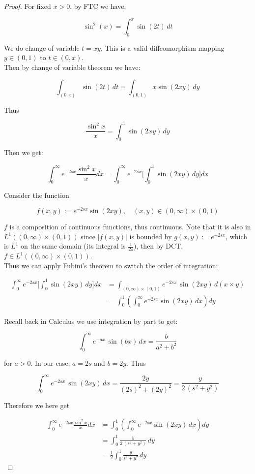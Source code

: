 \documentclass{qlnotes-export}
\begin{document}
\begin{proof}

For fixed \(x > 0\), by FTC we have:

\[\sin^{2}(x) = \int_{0}^{x}\sin(2t)\, dt\]

We do change of variable \(t = xy\). This is a valid diffeomorphism mapping \(y \in (0,1)\) to \(t \in (0,x)\).\\
Then by change of variable theorem we have:

\[\int_{(0,x)}\sin(2t)\, dt = \int_{(0,1)}x\sin(2xy)\, dy\]

Thus

\[\frac{\sin^{2}x}{x} = \int_{0}^{1}\sin(2xy)\, dy\]

Then we get:

\[\int_{0}^{\infty}e^{- 2sx}\frac{\sin^{2}x}{x} dx = \int_{0}^{\infty}e^{- 2sx}\lbrack\int_{0}^{1}\sin(2xy)\, dy\rbrack dx\]

Consider the function

\[f(x,y) := e^{- 2sx}\sin(2xy),\quad(x,y) \in (0,\infty) \times (0,1)\]

\(f\) is a composition of continuous functions, thus continuous. Note that it is also in \(L^{1}((0,\infty) \times (0,1))\) since \(|f(x,y)|\) is bounded by \(g(x,y) := e^{- 2sx}\), which is \(L^{1}\) on the same domain (its integral is \(\frac{1}{2s}\)), then by DCT, \(f \in L^{1}((0,\infty) \times (0,1))\).\\
Thus we can apply Fubini's theorem to switch the order of integration:

\[\begin{matrix}
{\int_{0}^{\infty}e^{- 2sx}\lbrack\int_{0}^{1}\sin(2xy)\, dy\rbrack dx} & {= \int_{(0,\infty) \times (0,1)}e^{- 2sx}\,\sin(2xy)\, d(x \times y)} \\
 & {= \int_{0}^{1}(\int_{0}^{\infty}e^{- 2sx}\sin(2xy)\, dx)dy}
\end{matrix}\]

Recall back in Calculus we use integration by part to get:

\[\int_{0}^{\infty}e^{- ax}\,\sin(bx)\, dx = \frac{b}{a^{2} + b^{2}}\]

for \(a > 0\). In our case, \(a = 2s\) and \(b = 2y\). Thus

\[\int_{0}^{\infty}e^{- 2sx}\,\sin(2xy)\, dx = \frac{2y}{(2s)^{2} + (2y)^{2}} = \frac{y}{2\,(s^{2} + y^{2})}\]

Therefore we here get

\[\begin{matrix}
{\int_{0}^{\infty}e^{- 2sx}\frac{\sin^{2}x}{x} dx} & {= \int_{0}^{1}(\int_{0}^{\infty}e^{- 2sx}\sin(2xy)\, dx)dy} \\
 & {= \int_{0}^{1}\frac{y}{2\,(s^{2} + y^{2})}\, dy} \\
 & {= \frac{1}{2}\int_{0}^{1}\frac{y}{s^{2} + y^{2}}\, dy}
\end{matrix}\]


\end{proof}
\end{document}
